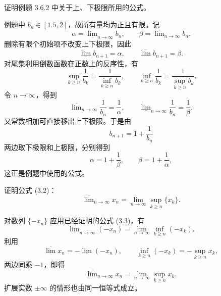 \begin{xexercise}[3.6.4 练习题 7]
证明例题 3.6.2 中关于上、下极限所用的公式。
\end{xexercise}
\begin{xsolution}
例题中 $b_n\in[1.5,2]$，故所有量均为正且有限。记
\[
  \alpha=\underline{\lim}_{n\to\infty}b_n,
  \qquad
  \beta=\overline{\lim}_{n\to\infty}b_n.
\]
删除有限个初始项不改变上下极限，因此
\[
  \underline{\lim}b_{n+1}=\alpha,
  \qquad
  \overline{\lim}b_{n+1}=\beta.
\]
对尾集利用倒数函数在正数上的反序性，有
\[
  \sup_{k\geqslant n}\frac1{b_k}
  =\frac1{\inf_{k\geqslant n}b_k},
  \qquad
  \inf_{k\geqslant n}\frac1{b_k}
  =\frac1{\sup_{k\geqslant n}b_k}.
\]
令 $n\to\infty$，得到
\[
  \overline{\lim}_{n\to\infty}\frac1{b_n}=\frac1\alpha,
  \qquad
  \underline{\lim}_{n\to\infty}\frac1{b_n}=\frac1\beta.
\]
又常数相加可直接移出上下极限。于是由
\[
  b_{n+1}=1+\frac1{b_n}
\]
两边取下极限和上极限，分别得到
\[
  \alpha=1+\frac1\beta,
  \qquad
  \beta=1+\frac1\alpha,
\]
这正是例题中使用的公式。
\end{xsolution}

\begin{xexercise}[3.6.4 练习题 8]
证明公式 (3.2)：
\[
  \overline{\lim}_{n\to\infty}x_n
  =\lim_{n\to\infty}\sup_{k\geqslant n}\{x_k\}.
\]
\end{xexercise}
\begin{xsolution}
对数列 $\{-x_n\}$ 应用已经证明的公式 (3.3)，有
\[
  \underline{\lim}_{n\to\infty}(-x_n)
  =\lim_{n\to\infty}\inf_{k\geqslant n}(-x_k).
\]
利用
\[
  \overline{\lim}x_n=-\underline{\lim}(-x_n),
  \qquad
  \inf_{k\geqslant n}(-x_k)
  =-\sup_{k\geqslant n}x_k,
\]
两边同乘 $-1$，即得
\[
  \overline{\lim}_{n\to\infty}x_n
  =\lim_{n\to\infty}\sup_{k\geqslant n}x_k.
\]
扩展实数 $\pm\infty$ 的情形也由同一恒等式成立。
\end{xsolution}

